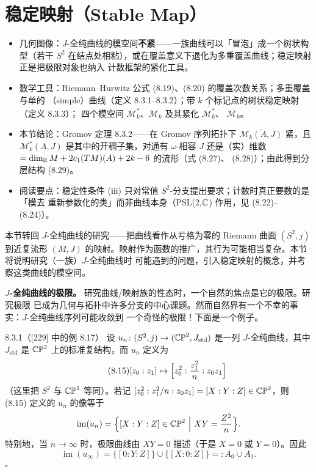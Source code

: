 
\section{稳定映射（Stable Map）}

\begin{keytakeaways}
\begin{itemize}
  \item 几何图像：$J$-全纯曲线的模空间\textbf{不紧}——一族曲线可以「冒泡」成一个树状构型（若干
        $S^2$ 在结点处相粘），或在覆盖意义下退化为多重覆盖曲线；稳定映射正是把极限对象也纳入
        计数框架的紧化工具。
  \item 数学工具：Riemann--Hurwitz 公式 (8.19)、(8.20) 的覆盖次数关系；多重覆盖与单的
        （simple）曲线（定义 8.3.1--8.3.2）；带 $k$ 个标记点的树状稳定映射（定义 8.3.3）；
        四个模空间 $\mathcal{M}^*_k$、$\mathcal{M}_k$ 及其紧化 $\overline{\mathcal{M}^*_k}$、
        $\overline{\mathcal{M}_k}$。
  \item 本节结论：Gromov 定理 8.3.2——在 Gromov 序列拓扑下
        $\overline{\mathcal{M}_k(A,J)}$ 紧，且 $\mathcal{M}^*_k(A,J)$ 是其中的开稠子集，对通有
        $\omega$-相容 $J$ 还是（实）维数 $=\dim_{\mathbb{R}} M+2c_1(TM)(A)+2k-6$ 的流形（式 (8.27)、
        (8.28)）；由此得到分层结构 (8.29)。
  \item 阅读要点：稳定性条件 (iii) 只对常值 $S^2$-分支提出要求；计数时真正要数的是「模去
        重新参数化的类」而非曲线本身（PSL(2,$\mathbb{C}$) 作用，见 (8.22)--(8.24)）。
\end{itemize}
\end{keytakeaways}

本节转回 $J$-全纯曲线的研究——把曲线看作从亏格为零的 Riemann 曲面 $(S^2,j)$ 到近复流形
$(M,J)$ 的映射。映射作为函数的推广，其行为可能相当复杂。本节将说明研究（一族）$J$-全纯曲线时
可能遇到的问题，引入稳定映射的概念，并考察这类曲线的模空间。

\textbf{$J$-全纯曲线的极限。} 研究曲线/映射族的性态时，一个自然的焦点是它的极限。研究极限
已成为几何与拓扑中许多分支的中心课题。然而自然界有一个不幸的事实：$J$-全纯曲线序列可能收敛到
一个奇怪的极限！下面是一个例子。

\begin{wexam}{8.3.1}（[229] 中的例 8.17）
  设 $u_n\colon(S^2,j)\to(\mathbb{CP}^2,J_{\mathrm{std}})$ 是一列 $J$-全纯曲线，其中
  $J_{\mathrm{std}}$ 是 $\mathbb{CP}^2$ 上的标准复结构，而 $u_n$ 定义为
  \begin{equation}\tag{8.15}
    [z_0:z_1]\mapsto\Bigl[z_0^2:\frac{z_1^2}{n}:z_0z_1\Bigr]
  \end{equation}
  （这里把 $S^2$ 与 $\mathbb{CP}^1$ 等同）。若记 $[z_0^2:z_1^2/n:z_0z_1]=[X:Y:Z]\in\mathbb{CP}^2$，则
  (8.15) 定义的 $u_n$ 的像等于
  \[
    \operatorname{im}(u_n)
      =\Bigl\{[X:Y:Z]\in\mathbb{CP}^2\ \Big|\ XY=\frac{Z^2}{n}\Bigr\}.
  \]
  特别地，当 $n\to\infty$ 时，极限曲线由 $XY=0$ 描述（于是 $X=0$ 或 $Y=0$）。因此
  \[
    \operatorname{im}(u_\infty)=\{[0:Y:Z]\}\cup\{[X:0:Z]\}=:A_0\cup A_1.
  \]
  \hfill$\square$
\end{wexam}

